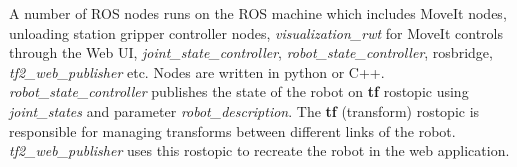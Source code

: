 A number of ROS nodes runs on the ROS machine which includes MoveIt nodes, unloading station gripper controller nodes, \textit{visualization\_rwt} for MoveIt controls through the Web UI, \textit{joint\_state\_controller}, \textit{robot\_state\_controller}, rosbridge, \textit{tf2\_web\_publisher} etc. Nodes are written in python or C++. \textit{robot\_state\_controller} publishes the state of the robot on \textbf{tf} rostopic using \textit{joint\_states} and parameter \textit{robot\_description}. The \textbf{tf} (transform) rostopic is responsible for managing transforms between different links of the robot. \textit{tf2\_web\_publisher} uses this rostopic to recreate the robot in the web application.

